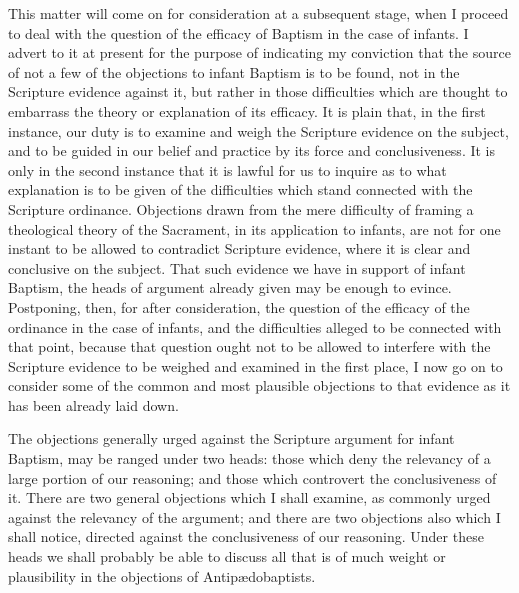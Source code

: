\documentclass[]{book}
\begin{document}
This matter will come on for consideration at a subsequent stage, when I proceed to deal with the question of the efficacy of Baptism in the case of infants. I advert to it at present for the purpose of indicating my conviction that the source of not a few of the objections to infant Baptism is to be found, not in the Scripture evidence against it, but rather in those difficulties which are thought to embarrass the theory or explanation of its efficacy. It is plain that, in the first instance, our duty is to examine and weigh the Scripture evidence on the subject, and to be guided in our belief and practice by its force and conclusiveness. It is only in the second instance that it is lawful for us to inquire as to what explanation is to be given of the difficulties which stand connected with the Scripture ordinance. Objections drawn from the mere difficulty of framing a theological theory of the Sacrament, in its application to infants, are not for one instant to be allowed to contradict Scripture evidence, where it is clear and conclusive on the subject. That such evidence we have in support of infant Baptism, the heads of argument already given may be enough to evince. Postponing, then, for after consideration, the question of the efficacy of the ordinance in the case of infants, and the difficulties alleged to be connected with that point, because that question ought not to be allowed to interfere with the Scripture evidence to be weighed and examined in the first place, I now go on to consider some of the common and most plausible objections to that evidence as it has been already laid down.

The objections generally urged against the Scripture argument for infant Baptism, may be ranged under two heads: those which deny the relevancy of a large portion of our reasoning; and those which controvert the conclusiveness of it. There are two general objections which I shall examine, as commonly urged against the relevancy of the argument; and there are two objections also which I shall notice, directed against the conclusiveness of our reasoning. Under these heads we shall probably be able to discuss all that is of much weight or plausibility in the objections of Antipædobaptists.
\end{document}

